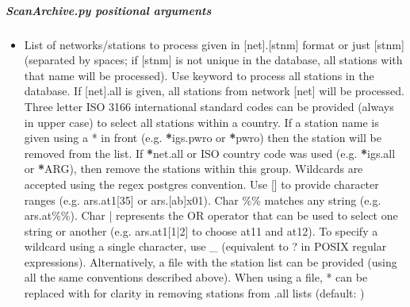 \documentclass[letterpaper,10pt,english]{sphinxmanual}
\begin{document}
\subparagraph{ScanArchive.py positional arguments}
\label{\detokenize{pgamit.com:ScanArchive.py-positional-arguments}}\begin{itemize}
\item {} 
\sphinxAtStartPar
{\hyperref[\detokenize{pgamit.com:ScanArchive.py-all|net.stnm}]{}} \sphinxhyphen{} List of networks/stations to process given in {[}net{]}.{[}stnm{]} format or just {[}stnm{]} (separated by spaces; if {[}stnm{]} is not unique in the database, all stations with that name will be processed). Use keyword  to process all stations in the database. If {[}net{]}.all is given, all stations from network {[}net{]} will be processed. Three letter ISO 3166 international standard codes can be provided (always in upper case) to select all stations within a country. If a station name is given using a * in front (e.g. {\color{red}\bfseries{}*}igs.pwro or {\color{red}\bfseries{}*}pwro) then the station will be removed from the list. If {\color{red}\bfseries{}*}net.all or ISO country code was used (e.g. {\color{red}\bfseries{}*}igs.all or {\color{red}\bfseries{}*}ARG), then remove the stations within this group. Wildcards are accepted using the regex postgres convention. Use {[}{]} to provide character ranges (e.g. ars.at1{[}3\sphinxhyphen{}5{]} or ars.{[}a\sphinxhyphen{}b{]}x01). Char \%\% matches any string (e.g. ars.at\%\%). Char | represents the OR operator that can be used to select one string or another (e.g. ars.at1{[}1|2{]} to choose at11 and at12). To specify a wildcard using a single character, use \_ (equivalent to ? in POSIX regular expressions). Alternatively, a file with the station list can be provided (using all the same conventions described above). When using a file, * can be replaced with \sphinxhyphen{} for clarity in removing stations from .all lists (default: )

\end{itemize}
\end{document}
